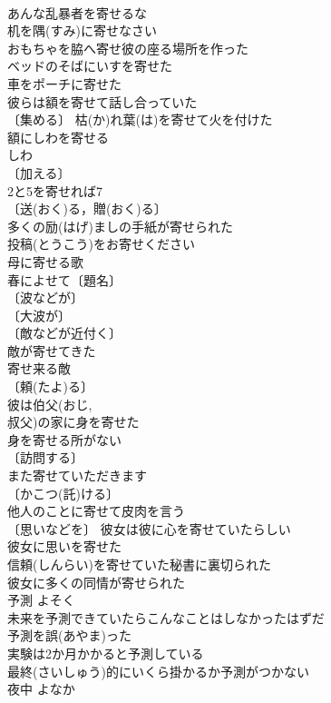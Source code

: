 \documentclass[8pt]{extreport}
\begin{document}
\begin{CJK}{UTF8}{min}
\\	あんな乱暴者を寄せるな 
\\	机を隅(すみ)に寄せなさい 
\\	おもちゃを脇へ寄せ彼の座る場所を作った 
\\	ベッドのそばにいすを寄せた 
\\	車をポーチに寄せた 
\\	彼らは額を寄せて話し合っていた 
\\	〔集める〕 枯(か)れ葉(は)を寄せて火を付けた 
\\	額にしわを寄せる 
\\	しわ　
\\	〔加える〕
\\	2と5を寄せれば7 
\\	〔送(おく)る，贈(おく)る〕
\\	多くの励(はげ)ましの手紙が寄せられた 
\\	投稿(とうこう)をお寄せください 
\\	母に寄せる歌 
\\	春によせて〔題名〕 
\\	〔波などが〕
\\	〔大波が〕
\\	〔敵などが近付く〕
\\	敵が寄せてきた 
\\	寄せ来る敵 
\\	〔頼(たよ)る〕
\\	彼は伯父(おじ, 
\\	叔父)の家に身を寄せた 
\\	身を寄せる所がない 
\\	〔訪問する〕
\\	また寄せていただきます 
\\	〔かこつ(託)ける〕　
\\	他人のことに寄せて皮肉を言う 
\\	〔思いなどを〕 彼女は彼に心を寄せていたらしい 
\\	彼女に思いを寄せた 
\\	信頼(しんらい)を寄せていた秘書に裏切られた 
\\	彼女に多くの同情が寄せられた 
\\	予測	よそく	
\\	未来を予測できていたらこんなことはしなかったはずだ 
\\	予測を誤(あやま)った 
\\	実験は2か月かかると予測している 
\\	最終(さいしゅう)的にいくら掛かるか予測がつかない 
\\	夜中	よなか	

\end{CJK}
\end{document}
